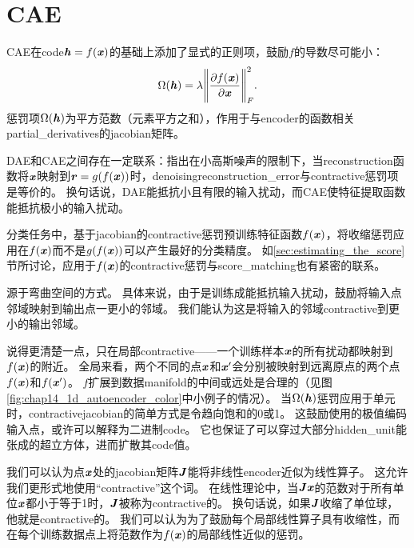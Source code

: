 
\section{\gls{CAE}}
\label{sec:contractive_autoencoders}
\gls{CAE}\citep{Rifai+al-2011-small,Salah+al-2011-small}在\gls{code}$\boldsymbol{\mathit{h}} = f(\boldsymbol{\mathit{x}})$的基础上添加了显式的正则项，鼓励$f$的导数尽可能小：
\begin{align}
 \Omega(\boldsymbol{\mathit{h}}) = \lambda \Bigg\| \frac{\partial f(\boldsymbol{\mathit{x}})}{\partial \boldsymbol{\mathit{x}}} \Bigg\|_F^2 .
\end{align}
惩罚项$\Omega(\boldsymbol{\mathit{h}})$为平方范数（元素平方之和），作用于与\gls{encoder}的函数相关\gls{partial_derivatives}的\gls{jacobian}矩阵。


\gls{DAE}和\gls{CAE}之间存在一定联系：\citet{Alain+Bengio-ICLR2013-small}指出在小高斯噪声的限制下，当\gls{reconstruction}函数将$\boldsymbol{\mathit{x}}$映射到$\boldsymbol{\mathit{r}} = g(f(\boldsymbol{\mathit{x}}))$时，\gls{denoising}\gls{reconstruction_error}与\gls{contractive}惩罚项是等价的。
换句话说，\gls{DAE}能抵抗小且有限的输入扰动，而\gls{CAE}使特征提取函数能抵抗极小的输入扰动。

分类任务中，基于\gls{jacobian}的\gls{contractive}惩罚预训练特征函数$f(\boldsymbol{\mathit{x}})$，将收缩惩罚应用在$f(\boldsymbol{\mathit{x}})$而不是$g(f(\boldsymbol{\mathit{x}}))$可以产生最好的分类精度。
如\ref{sec:estimating_the_score}节所讨论，应用于$f(\boldsymbol{\mathit{x}})$的\gls{contractive}惩罚与\gls{score_matching}也有紧密的联系。

源于弯曲空间的方式。
具体来说，由于是训练成能抵抗输入扰动，鼓励将输入点邻域映射到输出点一更小的邻域。
我们能认为这是将输入的邻域\gls{contractive}到更小的输出邻域。


说得更清楚一点，只在局部\gls{contractive}——一个训练样本$\boldsymbol{\mathit{x}}$的所有扰动都映射到$f(\boldsymbol{\mathit{x}})$的附近。
全局来看，两个不同的点$\boldsymbol{\mathit{x}}$和$\boldsymbol{\mathit{x}}'$会分别被映射到远离原点的两个点$f(\boldsymbol{\mathit{x}})$和$f(\boldsymbol{\mathit{x}}')$。
$f$扩展到数据\gls{manifold}的中间或远处是合理的（见图\ref{fig:chap14_1d_autoencoder_color}中小例子的情况）。
当$\Omega(\boldsymbol{\mathit{h}})$惩罚应用于单元时，\gls{contractive}\gls{jacobian}的简单方式是令趋向饱和的0或1。
这鼓励使用的极值编码输入点，或许可以解释为二进制\gls{code}。
它也保证了可以穿过大部分\gls{hidden_unit}能张成的超立方体，进而扩散其\gls{code}值。

我们可以认为点$\boldsymbol{\mathit{x}}$处的\gls{jacobian}矩阵$\boldsymbol{\mathit{J}}$能将非线性\gls{encoder}近似为线性算子。
这允许我们更形式地使用``\gls{contractive}''这个词。
在线性理论中，当$\boldsymbol{\mathit{J}}\boldsymbol{\mathit{x}}$的范数对于所有单位$\boldsymbol{\mathit{x}}$都小于等于1时，$\boldsymbol{\mathit{J}}$被称为\gls{contractive}的。
换句话说，如果$\boldsymbol{\mathit{J}}$收缩了单位球，他就是\gls{contractive}的。
我们可以认为为了鼓励每个局部线性算子具有收缩性，而在每个训练数据点上将范数作为$f(\boldsymbol{\mathit{x}})$的局部线性近似的惩罚。



